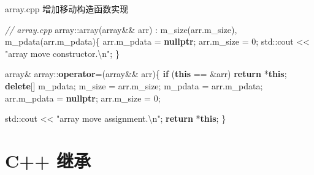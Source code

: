 \documentclass[
]{article}
\newenvironment{Shaded}{}{}
\newcommand{\BuiltInTok}[1]{#1}
\newcommand{\CommentTok}[1]{\textcolor[rgb]{0.38,0.63,0.69}{\textit{#1}}}
\newcommand{\ControlFlowTok}[1]{\textcolor[rgb]{0.00,0.44,0.13}{\textbf{#1}}}
\newcommand{\DecValTok}[1]{\textcolor[rgb]{0.25,0.63,0.44}{#1}}
\newcommand{\KeywordTok}[1]{\textcolor[rgb]{0.00,0.44,0.13}{\textbf{#1}}}
\newcommand{\NormalTok}[1]{#1}
\newcommand{\OperatorTok}[1]{\textcolor[rgb]{0.40,0.40,0.40}{#1}}
\newcommand{\SpecialCharTok}[1]{\textcolor[rgb]{0.25,0.44,0.63}{#1}}
\newcommand{\StringTok}[1]{\textcolor[rgb]{0.25,0.44,0.63}{#1}}
\newcommand{\VariableTok}[1]{\textcolor[rgb]{0.10,0.09,0.49}{#1}}
\begin{document}
array.cpp 增加移动构造函数实现\\

\begin{Shaded}
\begin{Highlighting}[]
\CommentTok{// array.cpp}
\NormalTok{array}\OperatorTok{::}\NormalTok{array}\OperatorTok{(}\NormalTok{array}\OperatorTok{\&\&}\NormalTok{ arr}\OperatorTok{)} \OperatorTok{:} \VariableTok{m\_size}\OperatorTok{(}\NormalTok{arr}\OperatorTok{.}\VariableTok{m\_size}\OperatorTok{),} \VariableTok{m\_pdata}\OperatorTok{(}\NormalTok{arr}\OperatorTok{.}\VariableTok{m\_pdata}\OperatorTok{)\{}
\NormalTok{    arr}\OperatorTok{.}\VariableTok{m\_pdata} \OperatorTok{=} \KeywordTok{nullptr}\OperatorTok{;}
\NormalTok{    arr}\OperatorTok{.}\VariableTok{m\_size} \OperatorTok{=} \DecValTok{0}\OperatorTok{;}
    \BuiltInTok{std::}\NormalTok{cout}\OperatorTok{ \textless{}\textless{}} \StringTok{"array move constructor.}\SpecialCharTok{\textbackslash{}n}\StringTok{"}\OperatorTok{;}
\OperatorTok{\}}

\NormalTok{array}\OperatorTok{\&}\NormalTok{ array}\OperatorTok{::}\KeywordTok{operator}\OperatorTok{=(}\NormalTok{array}\OperatorTok{\&\&}\NormalTok{ arr}\OperatorTok{)\{}
    \ControlFlowTok{if} \OperatorTok{(}\KeywordTok{this} \OperatorTok{==} \OperatorTok{\&}\NormalTok{arr}\OperatorTok{)}
        \ControlFlowTok{return} \OperatorTok{*}\KeywordTok{this}\OperatorTok{;}
    \KeywordTok{delete}\OperatorTok{[]} \VariableTok{m\_pdata}\OperatorTok{;}
    \VariableTok{m\_size} \OperatorTok{=}\NormalTok{ arr}\OperatorTok{.}\VariableTok{m\_size}\OperatorTok{;}
    \VariableTok{m\_pdata} \OperatorTok{=}\NormalTok{ arr}\OperatorTok{.}\VariableTok{m\_pdata}\OperatorTok{;}
\NormalTok{    arr}\OperatorTok{.}\VariableTok{m\_pdata} \OperatorTok{=} \KeywordTok{nullptr}\OperatorTok{;}
\NormalTok{    arr}\OperatorTok{.}\VariableTok{m\_size} \OperatorTok{=} \DecValTok{0}\OperatorTok{;}
    
    \BuiltInTok{std::}\NormalTok{cout}\OperatorTok{ \textless{}\textless{}} \StringTok{"array move assignment.}\SpecialCharTok{\textbackslash{}n}\StringTok{"}\OperatorTok{;}
    \ControlFlowTok{return} \OperatorTok{*}\KeywordTok{this}\OperatorTok{;}
\OperatorTok{\}}
\end{Highlighting}
\end{Shaded}

\hypertarget{c-ux7ee7ux627f}{%
\section{C++ 继承}\label{c-ux7ee7ux627f}}
\end{document}
